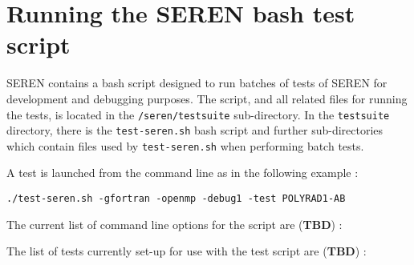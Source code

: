 \documentclass[a4paper]{article}
\newcommand{\NAME}{SEREN }
\newcommand{\name}{seren}
\newcommand{\var}[1]{\texttt{#1}}
\begin{document}


\newpage


\section{Running the \NAME bash test script}
\NAME contains a bash script designed to run batches of tests of \NAME for development and debugging purposes.  The script, and all related files for running the tests, is located in the \var{/\name/testsuite} sub-directory.  In the \var{testsuite} directory, there is the \var{test-seren.sh} bash script and further sub-directories which contain files used by \var{test-seren.sh} when performing batch tests. 

A test is launched from the command line as in the following example : \newline

\var{./test-seren.sh -gfortran -openmp -debug1 -test POLYRAD1-AB} \newline

The current list of command line options for the script are ({\bf TBD}) : 

The list of tests currently set-up for use with the test script are ({\bf TBD}) : 
\newline
\end{document}

